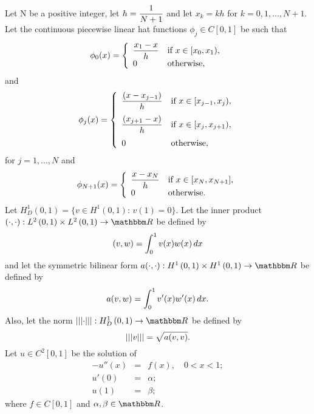 Let N be a positive integer, let $\displaystyle{h={1 \over N+1}}$ and let $x_k=kh$ for $k=0,1,\ldots,N+1$. Let the continuous piecewise linear hat functions $\phi_j\in C[0,1]$ be such that
\[
\phi_0(x) = \left\{\begin{array}{ll}
\displaystyle{x_1-x \over h} & \mbox{if }x\in[x_0,x_1),\\
0& \mbox{otherwise},
\end{array}\right.
\]
and
\[
\phi_j(x) = \left\{\begin{array}{ll}
\displaystyle{{(x-x_{j-1}) \over h}} & \displaystyle{\mbox{if }x\in[x_{j-1},x_j)},
\\[10pt]
\displaystyle{{(x_{j+1}-x) \over h}} & \displaystyle{\mbox{if }x\in[x_j,x_{j+1})},
\\[10pt]
0 & \mbox{otherwise},
\end{array}\right.
\]
for $j=1,\ldots,N$ and
\[
\phi_{N+1}(x) = \left\{\begin{array}{ll}
\displaystyle{x-x_N \over h} & \mbox{if }x\in[x_N,x_{N+1}],\\
0& \mbox{otherwise.}
\end{array}\right.
\]
Let $H^1_D\left(0,1\right)=\{v\in H^1\left(0,1\right):\,v(1)=0\}$. Let the inner product $\ip{\cdot,\cdot}:L^2\left(0,1\right)\times L^2\left(0,1\right)\to\R$ be defined by
\[
(v,w)=\int_0^1v(x)w(x)\,dx
\]
and let the symmetric bilinear form $a\ip{\cdot,\cdot}:H^1\left(0,1\right)\times H^1\left(0,1\right)\to\R$ be defined by
\[
a(v,w)=\int_0^1v'(x)w'(x)\,dx.
\]
Also, let the norm $\left|\left|\left|\cdot\right|\right|\right|:H^1_D\left(0,1\right)\to\R$ be defined by
\[
\left|\left|\left|v\right|\right|\right|=\sqrt{a(v,v)}.
\]
Let $u\in C^2[0,1]$ be the solution of
\begin{eqnarray*}
 -u''(x) &=& f(x),\quad 0<x<1;
\\
 u'(0) &=& \alpha;
\\
u(1) &=& \beta;
\end{eqnarray*}
where $f\in C[0,1]$ and $\alpha,\beta\in\R$. 
